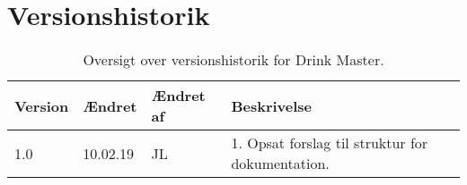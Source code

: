 \chapter{Versionshistorik}
\begin{table}[H] 
	\centering 
	\begin{tabular}{|p{1.5cm}|p{1.5cm}|p{2cm}|p{8cm}|}
		\hline
\textbf{Version} & \textbf{Ændret}  &  \textbf{Ændret af} &   \textbf{Beskrivelse}  \\ \hline
1.0 &   10.02.19 & JL & 1. Opsat forslag til struktur for dokumentation. \\ \hline
	\end{tabular}
	\caption{Oversigt over versionshistorik for Drink Master.}
	\label{tab:versionshistorik}
\end{table}
\FloatBarrier